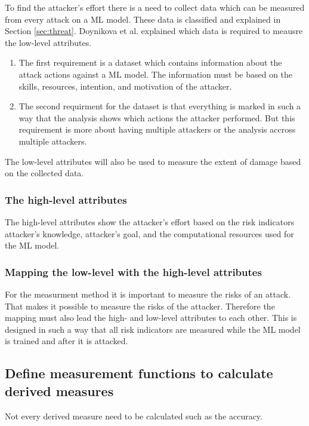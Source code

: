 To find the attacker's effort there is a need to collect data which can be measured from every attack on a ML model. These data is classified and explained in Section \ref{sec:threat}. Doynikova et al. explained which data is required to meausre the low-level attributes.

\begin{enumerate}
  \item The first requirement is a dataset which contains information about the attack actions against a ML model. The information must be based on the skills, resources, intention, and motivation of the attacker.
  \item The second requirment for the dataset is that everything is marked in such a way that the analysis shows which actions the attacker performed. But this requirement is more about having multiple attackers or the analysis accross multiple attackers.
\end{enumerate}

The low-level attributes will also be used to measure the extent of damage based on the collected data.

\subsubsection*{The high-level attributes}

The high-level attributes show the attacker's effort based on the risk indicators attacker's knowledge, attacker's goal, and the computational resources used for the ML model.

\subsubsection*{Mapping the low-level with the high-level attributes}

For the measurment method it is important to measure the risks of an attack. That makes it possible to measure the risks of the attacker. Therefore the mapping must also lead the high- and low-level attributes to each other. This is designed in such a way that all risk indicators are measured while the ML model is trained and after it is attacked.

\subsection{Define measurement functions to calculate derived measures}

Not every derived measure need to be calculated such as the accuracy.

